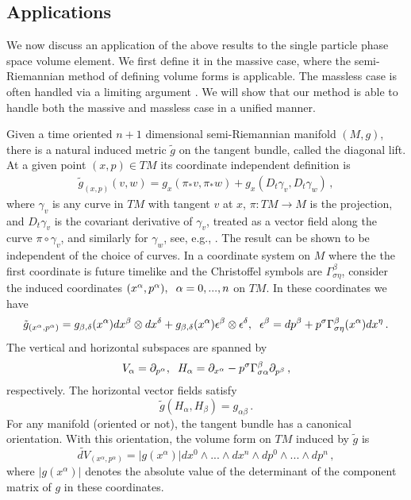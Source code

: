 \subsection{Applications}
We now discuss an application of the above results to the single particle phase space volume element. We first define it in the massive case, where the semi-Riemannian method of defining volume forms is applicable. The massless case is often handled via a limiting argument \cite{tsamparlis}. We will show that our method is able to handle both the massive and massless case in a unified manner.

 Given a time oriented $n+1$ dimensional semi-Riemannian manifold $(M,g)$, there is a natural induced metric $\tilde{g}$ on the tangent bundle, called the diagonal lift. At a given point $(x,p)\in TM$ its coordinate independent definition is
\begin{align}
\tilde{g}_{(x,p)}(v,w)=g_x(\pi_{*} v,\pi_{*} w)+g_x(D_t \gamma_v, D_t \gamma_w)\,,
\end{align}
where $\gamma_v$ is any curve in $TM$ with tangent $v$ at $x$, $\pi:TM\longrightarrow M$ is the projection, and $D_t\gamma_v$ is the covariant derivative of $\gamma_v$, treated as a vector field along the curve $\pi\circ\gamma_v$, and similarly for $\gamma_w$, see, e.g., \cite{pettini}. The result can be shown to be independent of the choice of curves. In a coordinate system on $M$ where the the first coordinate is future timelike and the Christoffel symbols are $\Gamma^\beta_{\sigma\eta}$, consider the induced coordinates $(x^\alpha,p^\alpha), \hspace{2mm}\alpha=0,...,n$ on $TM$. In these coordinates we have 
\begin{equation}
\tilde{g}_{(x^\alpha,p^\alpha)}=g_{\beta,\delta}(x^\alpha)dx^\beta\otimes dx^\delta +g_{\beta,\delta}(x^{\alpha})\epsilon^\beta\otimes \epsilon^\delta, \hspace{2mm} \epsilon^\beta=dp^\beta+p^\sigma\Gamma^\beta_{\sigma\eta}(x^{\alpha})dx^\eta\,.
\end{equation}
The vertical and horizontal subspaces are spanned by
\begin{equation}\label{horizontalSubspace}
V_\alpha=\partial_{p^\alpha}, \hspace{2mm} H_\alpha=\partial_{x^\alpha}-p^\sigma\Gamma_{\sigma\alpha}^\beta\partial_{p^\beta}\,,
\end{equation}
respectively. The horizontal vector fields satisfy
\begin{equation}
\tilde{g}(H_\alpha,H_\beta)=g_{\alpha\beta}\,.
\end{equation}
For any manifold (oriented or not), the tangent bundle has a canonical orientation. With this orientation, the volume form on $TM$ induced by $\tilde{g}$ is
\begin{equation}
\widetilde{dV}_{(x^\alpha,p^{\alpha})}=|g(x^\alpha)|dx^0\wedge...\wedge dx^n\wedge dp^0\wedge...\wedge dp^n\,,
\end{equation}
where $|g(x^\alpha)|$ denotes the absolute value of the determinant of the component matrix of $g$ in these coordinates.

